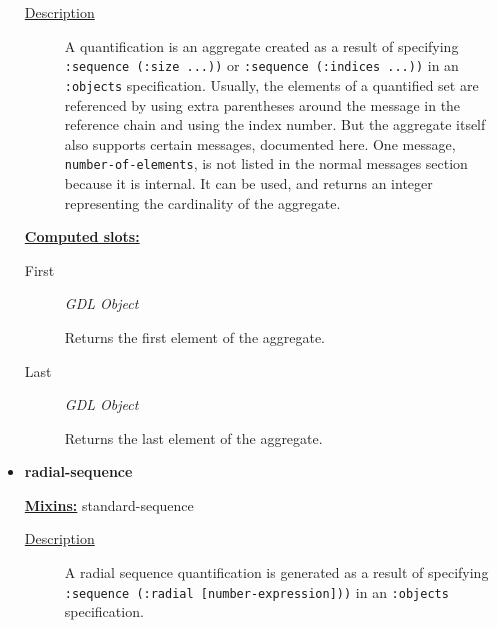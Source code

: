 \documentclass [11pt]{book}
\begin{document}
\begin{itemize}
\begin{description}
\item [
\underline{Description}]


A quantification is an aggregate created as a result of specifying \texttt{:sequence (:size ...))} or
\texttt{:sequence (:indices ...))} in an \texttt{:objects} specification. Usually, the elements of a quantified set are referenced by using
extra parentheses around the message in the reference chain and using the index number. But the aggregate itself also supports certain
messages, documented here. One message, \texttt{number-of-elements}, is not listed in the normal messages section because it is 
internal. It can be used, and returns an integer representing the cardinality of the aggregate.



\end{description}








\textbf{
\underline{Computed slots:}}

\begin{description}

\item [First]
\emph{GDL Object}

 Returns the first element of the aggregate.




\item [Last]
\emph{GDL Object}

 Returns the last element of the aggregate.




\end{description}







\item {}
\label{prim:radial-sequence}
\textbf{radial-sequence}


\textbf{
\underline{Mixins:}} standard-sequence





\begin{description}

\item [
\underline{Description}]


A radial sequence quantification is generated as a result of specifying 
\texttt{:sequence (:radial [number-expression]))} in an \texttt{:objects} specification.




\end{description}
\end{itemize}
\end{document}
